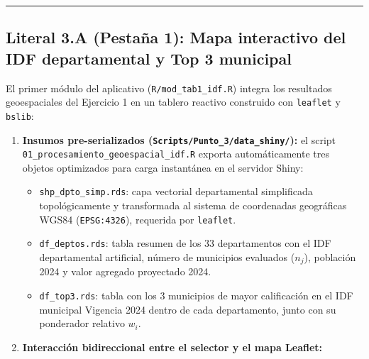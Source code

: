\documentclass[
  10pt,
  letterpaper,
  DIV=11,
  numbers=noendperiod]{scrartcl}
\providecommand{\tightlist}{%
  \setlength{\itemsep}{0pt}\setlength{\parskip}{0pt}}
\begin{document}
\begin{center}\rule{0.5\linewidth}{0.5pt}\end{center}

\subsection{Literal 3.A (Pestaña 1): Mapa interactivo del IDF
departamental y Top 3
municipal}\label{literal-3.a-pestauxf1a-1-mapa-interactivo-del-idf-departamental-y-top-3-municipal}

El primer módulo del aplicativo (\texttt{R/mod\_tab1\_idf.R}) integra
los resultados geoespaciales del Ejercicio 1 en un tablero reactivo
construido con \texttt{leaflet} y \texttt{bslib}:

\begin{enumerate}
\def\labelenumi{\arabic{enumi}.}
\tightlist
\item
  \textbf{Insumos pre-serializados
  (\texttt{Scripts/Punto\_3/data\_shiny/}):} el script
  \texttt{01\_procesamiento\_geoespacial\_idf.R} exporta automáticamente
  tres objetos optimizados para carga instantánea en el servidor Shiny:

  \begin{itemize}
  \tightlist
  \item
    \texttt{shp\_dpto\_simp.rds}: capa vectorial departamental
    simplificada topológicamente y transformada al sistema de
    coordenadas geográficas WGS84 (\texttt{EPSG:4326}), requerida por
    \texttt{leaflet}.
  \item
    \texttt{df\_deptos.rds}: tabla resumen de los 33 departamentos con
    el IDF departamental artificial, número de municipios evaluados
    (\(n_j\)), población 2024 y valor agregado proyectado 2024.
  \item
    \texttt{df\_top3.rds}: tabla con los 3 municipios de mayor
    calificación en el IDF municipal Vigencia 2024 dentro de cada
    departamento, junto con su ponderador relativo \(w_i\).
  \end{itemize}
\item
  \textbf{Interacción bidireccional entre el selector y el mapa
  Leaflet:}


\end{enumerate}
\end{document}
